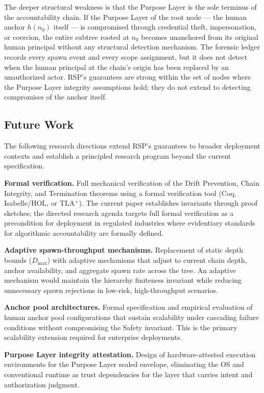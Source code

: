 The deeper structural weakness is that the Purpose Layer is the sole terminus of the accountability chain. If the Purpose Layer of the root node — the human anchor $h(n_0)$ itself — is compromised through credential theft, impersonation, or coercion, the entire subtree rooted at $n_0$ becomes unanchored from its original human principal without any structural detection mechanism. The forensic ledger records every spawn event and every scope assignment, but it does not detect when the human principal at the chain's origin has been replaced by an unauthorized actor. RSP's guarantees are strong within the set of nodes where the Purpose Layer integrity assumptions hold; they do not extend to detecting compromises of the anchor itself.

\subsection{Future Work}\label{sec:rs-future-work}

The following research directions extend RSP's guarantees to broader deployment contexts and establish a principled research program beyond the current specification.

\textbf{Formal verification.} Full mechanical verification of the Drift Prevention, Chain Integrity, and Termination theorems using a formal verification tool (Coq, Isabelle/HOL, or TLA$^+$). The current paper establishes invariants through proof sketches; the directed research agenda targets full formal verification as a precondition for deployment in regulated industries where evidentiary standards for algorithmic accountability are formally defined.

\textbf{Adaptive spawn-throughput mechanisms.} Replacement of static depth bounds ($D_{\max}$) with adaptive mechanisms that adjust to current chain depth, anchor availability, and aggregate spawn rate across the tree. An adaptive mechanism would maintain the hierarchy finiteness invariant while reducing unnecessary spawn rejections in low-risk, high-throughput scenarios.

\textbf{Anchor pool architectures.} Formal specification and empirical evaluation of human anchor pool configurations that sustain scalability under cascading failure conditions without compromising the Safety invariant. This is the primary scalability extension required for enterprise \bxthree{} deployments.

\textbf{Purpose Layer integrity attestation.} Design of hardware-attested execution environments for the Purpose Layer sealed envelope, eliminating the OS and conventional runtime as trust dependencies for the layer that carries intent and authorization judgment.

